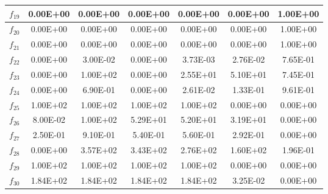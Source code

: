\begin{table}[t]
\begin{scriptsize}
\begin{tabular}{|c|c|c|c|c|c|c|}
$f_{19}$ & 0.00E+00 & 0.00E+00 & 0.00E+00 & 0.00E+00 & 0.00E+00 & 1.00E+00 \\ \hline
$f_{20}$ & 0.00E+00 & 0.00E+00 & 0.00E+00 & 0.00E+00 & 0.00E+00 & 1.00E+00 \\ \hline
$f_{21}$ & 0.00E+00 & 0.00E+00 & 0.00E+00 & 0.00E+00 & 0.00E+00 & 1.00E+00 \\ \hline
$f_{22}$ & 0.00E+00 & 3.00E-02 & 0.00E+00 & 3.73E-03 & 2.76E-02 & 7.65E-01 \\ \hline
$f_{23}$ & 0.00E+00 & 1.00E+02 & 0.00E+00 & 2.55E+01 & 5.10E+01 & 7.45E-01 \\ \hline
$f_{24}$ & 0.00E+00 & 6.90E-01 & 0.00E+00 & 2.61E-02 & 1.33E-01 & 9.61E-01 \\ \hline
$f_{25}$ & 1.00E+02 & 1.00E+02 & 1.00E+02 & 1.00E+02 & 0.00E+00 & 0.00E+00 \\ \hline
$f_{26}$ & 8.00E-02 & 1.00E+02 & 5.29E+01 & 5.20E+01 & 3.19E+01 & 0.00E+00 \\ \hline
$f_{27}$ & 2.50E-01 & 9.10E-01 & 5.40E-01 & 5.60E-01 & 2.92E-01 & 0.00E+00 \\ \hline
$f_{28}$ & 0.00E+00 & 3.57E+02 & 3.43E+02 & 2.76E+02 & 1.60E+02 & 1.96E-01 \\ \hline
$f_{29}$ & 1.00E+02 & 1.00E+02 & 1.00E+02 & 1.00E+02 & 0.00E+00 & 0.00E+00 \\ \hline
$f_{30}$ & 1.84E+02 & 1.84E+02 & 1.84E+02 & 1.84E+02 & 3.25E-02 & 0.00E+00 \\ \hline
\end{tabular}%
\end{scriptsize}
\end{table}

